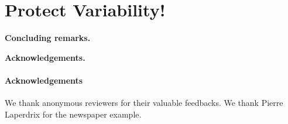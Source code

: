 \documentclass{sig-alternate}
\begin{document}
\section{Protect Variability!}
\label{sec:summary}


% 

\textbf{Concluding remarks.}
\label{sec:conclusion}


\textbf{Acknowledgements.}\fi
{}\paragraph{Acknowledgements}\fi We thank anonymous reviewers for their valuable feedbacks. %
 We thank Pierre Laperdrix for the newspaper example. \fi
\fi
%
\scriptsize

  
%
%

\end{document}
